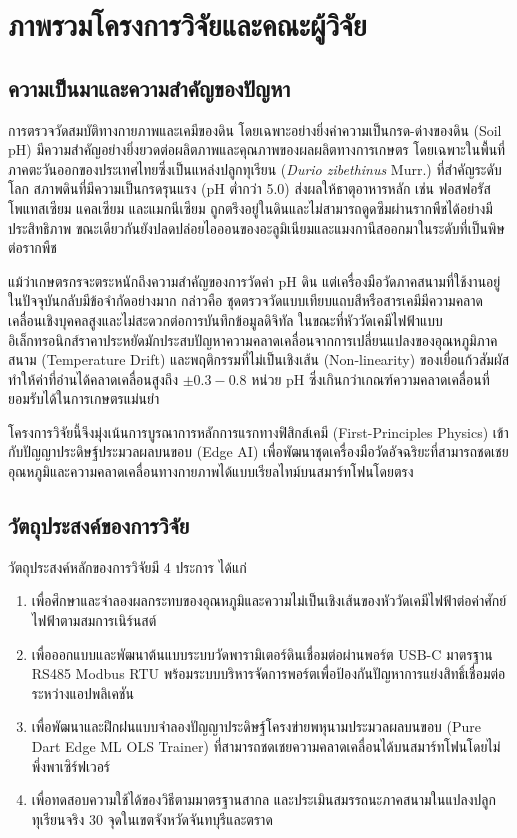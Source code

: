 \chapter{ภาพรวมโครงการวิจัยและคณะผู้วิจัย}
\label{chap:overview}

\section{ความเป็นมาและความสำคัญของปัญหา}
การตรวจวัดสมบัติทางกายภาพและเคมีของดิน โดยเฉพาะอย่างยิ่งค่าความเป็นกรด-ด่างของดิน (Soil pH) มีความสำคัญอย่างยิ่งยวดต่อผลิตภาพและคุณภาพของผลผลิตทางการเกษตร โดยเฉพาะในพื้นที่ภาคตะวันออกของประเทศไทยซึ่งเป็นแหล่งปลูกทุเรียน (\textit{Durio zibethinus} Murr.) ที่สำคัญระดับโลก สภาพดินที่มีความเป็นกรดรุนแรง (pH ต่ำกว่า 5.0) ส่งผลให้ธาตุอาหารหลัก เช่น ฟอสฟอรัส โพแทสเซียม แคลเซียม และแมกนีเซียม ถูกตรึงอยู่ในดินและไม่สามารถดูดซึมผ่านรากพืชได้อย่างมีประสิทธิภาพ ขณะเดียวกันยังปลดปล่อยไอออนของอะลูมิเนียมและแมงกานีสออกมาในระดับที่เป็นพิษต่อรากพืช

แม้ว่าเกษตรกรจะตระหนักถึงความสำคัญของการวัดค่า pH ดิน แต่เครื่องมือวัดภาคสนามที่ใช้งานอยู่ในปัจจุบันกลับมีข้อจำกัดอย่างมาก กล่าวคือ ชุดตรวจวัดแบบเทียบแถบสีหรือสารเคมีมีความคลาดเคลื่อนเชิงบุคคลสูงและไม่สะดวกต่อการบันทึกข้อมูลดิจิทัล ในขณะที่หัววัดเคมีไฟฟ้าแบบอิเล็กทรอนิกส์ราคาประหยัดมักประสบปัญหาความคลาดเคลื่อนจากการเปลี่ยนแปลงของอุณหภูมิภาคสนาม (Temperature Drift) และพฤติกรรมที่ไม่เป็นเชิงเส้น (Non-linearity) ของเยื่อแก้วสัมผัส ทำให้ค่าที่อ่านได้คลาดเคลื่อนสูงถึง $\pm 0.3 - 0.8$ หน่วย pH ซึ่งเกินกว่าเกณฑ์ความคลาดเคลื่อนที่ยอมรับได้ในการเกษตรแม่นยำ

โครงการวิจัยนี้จึงมุ่งเน้นการบูรณาการหลักการแรกทางฟิสิกส์เคมี (First-Principles Physics) เข้ากับปัญญาประดิษฐ์ประมวลผลบนขอบ (Edge AI) เพื่อพัฒนาชุดเครื่องมือวัดอัจฉริยะที่สามารถชดเชยอุณหภูมิและความคลาดเคลื่อนทางกายภาพได้แบบเรียลไทม์บนสมาร์ทโฟนโดยตรง

\section{วัตถุประสงค์ของการวิจัย}
วัตถุประสงค์หลักของการวิจัยมี 4 ประการ ได้แก่
\begin{enumerate}
    \item เพื่อศึกษาและจำลองผลกระทบของอุณหภูมิและความไม่เป็นเชิงเส้นของหัววัดเคมีไฟฟ้าต่อค่าศักย์ไฟฟ้าตามสมการเนิร์นสต์
    \item เพื่อออกแบบและพัฒนาต้นแบบระบบวัดพารามิเตอร์ดินเชื่อมต่อผ่านพอร์ต USB-C มาตรฐาน RS485 Modbus RTU พร้อมระบบบริหารจัดการพอร์ตเพื่อป้องกันปัญหาการแย่งสิทธิ์เชื่อมต่อระหว่างแอปพลิเคชัน
    \item เพื่อพัฒนาและฝึกฝนแบบจำลองปัญญาประดิษฐ์โครงข่ายพหุนามประมวลผลบนขอบ (Pure Dart Edge ML OLS Trainer) ที่สามารถชดเชยความคลาดเคลื่อนได้บนสมาร์ทโฟนโดยไม่พึ่งพาเซิร์ฟเวอร์
    \item เพื่อทดสอบความใช้ได้ของวิธีตามมาตรฐานสากล และประเมินสมรรถนะภาคสนามในแปลงปลูกทุเรียนจริง 30 จุดในเขตจังหวัดจันทบุรีและตราด
\end{enumerate}

